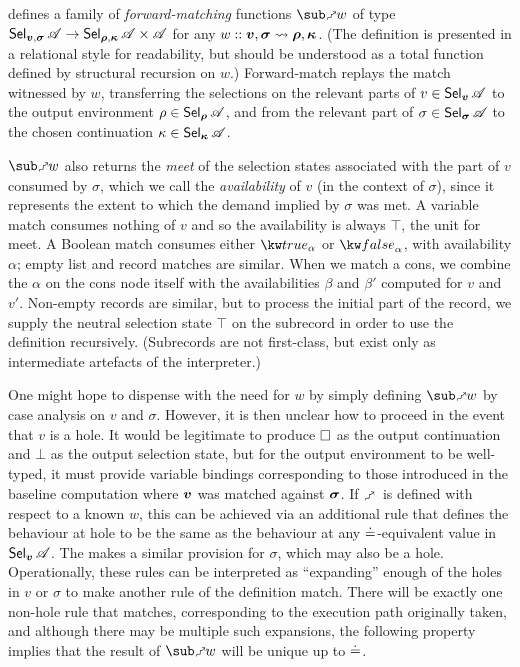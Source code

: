  defines a family of \emph{forward-matching} functions $\matchFwdF{w}$ of type $\textup{\textsf{Sel}}_{\bm{v}, \bm{\sigma}}\,{\mathscr{A}} \to \textup{\textsf{Sel}}_{\bm{\rho}, \bm{\kappa}}\,{\mathscr{A}} \times \mathscr{A}$ for any $w :: \bm{v}, \bm{\sigma} \rightsquigarrow \bm{\rho}, \bm{\kappa}$. (The definition is presented in a relational style for readability, but should be understood as a total function defined by structural recursion on $w$.) Forward-match replays the match witnessed by $w$, transferring the selections on the relevant parts of $v \in \textup{\textsf{Sel}}_{\bm{v}}\,{\mathscr{A}}$ to the output environment $\rho \in \textup{\textsf{Sel}}_{\bm{\rho}}\,{\mathscr{A}}$, and from the relevant part of $\sigma \in \textup{\textsf{Sel}}_{\bm{\sigma}}\,{\mathscr{A}}$ to the chosen continuation $\kappa \in \textup{\textsf{Sel}}_{\bm{\kappa}}\,{\mathscr{A}}$.

$\matchFwdF{w}$ also returns the \emph{meet} of the selection states associated with the part of $v$ consumed by $\sigma$, which we call the \emph{availability} of $v$ (in the context of $\sigma$), since it represents the extent to which the demand implied by $\sigma$ was met. A variable match consumes nothing of $v$ and so the availability is always $\top$, the unit for meet. A Boolean match consumes either $\annot{\exTrue}{\alpha}$ or $\annot{\exFalse}{\alpha}$, with availability $\alpha$; empty list and record matches are similar. When we match a cons, we combine the $\alpha$ on the cons node itself with the availabilities $\beta$ and $\beta'$ computed for $v$ and $v'$. Non-empty records are similar, but to process the initial part of the record, we supply the neutral selection state $\top$ on the subrecord in order to use the definition recursively. (Subrecords are not first-class, but exist only as intermediate artefacts of the interpreter.)

One might hope to dispense with the need for $w$ by simply defining $\matchFwdF{w}$ by case analysis on $v$ and $\sigma$. However, it is then unclear how to proceed in the event that $v$ is a hole. It would be legitimate to produce $\square$ as the output continuation and $\bot$ as the output selection state, but for the output environment to be well-typed, it must provide variable bindings corresponding to those introduced in the baseline computation where $\bm{v}$ was matched against $\bm{\sigma}$. If $\matchFwdS$ is defined with respect to a known $w$, this can be achieved via an additional rule  that defines the behaviour at hole to be the same as the behaviour at any $\doteq$-equivalent value in $\textup{\textsf{Sel}}_{\bm{v}}\,{\mathscr{A}}$. The  makes a similar provision for $\sigma$, which may also be a hole. Operationally, these rules can be interpreted as ``expanding'' enough of the holes in $v$ or $\sigma$ to make another rule of the definition match. There will be exactly one non-hole rule that matches, corresponding to the execution path originally taken, and although there may be multiple such expansions, the following property implies that the result of $\matchFwdF{w}$ will be unique up to $\doteq$.

